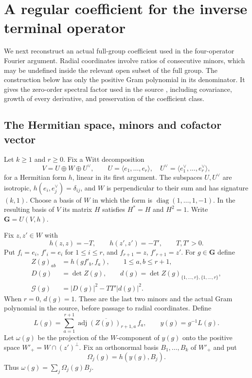 \section{A regular coefficient for the inverse terminal operator}
\label{rl-section}

We next reconstruct an actual full-group coefficient used in the
four-operator Fourier argument.  Radial coordinates involve ratios
of consecutive minors, which may be undefined inside the relevant
open subset of the full group.  The construction below has only the
positive Gram polynomial in its denominator.  It gives the
zero-order spectral factor used in the source
\cite{alpo-uniform-source}, including covariance, growth of every
derivative, and preservation of the coefficient class.

\subsection{The Hermitian space, minors and cofactor vector}

Let $k\geq1$ and $r\geq0$.  Fix a Witt decomposition
\[
 V=U\oplus W\oplus U^\vee,\qquad
 U=\langle e_1,\ldots,e_r\rangle,\quad
 U^\vee=\langle e_1^\vee,\ldots,e_r^\vee\rangle,
\]
for a Hermitian form $h$, linear in its first argument.
The subspaces $U,U^\vee$ are isotropic,
$h(e_i,e_j^\vee)=\delta_{ij}$, and $W$ is perpendicular
to their sum and has signature $(k,1)$.
Choose a basis of $W$ in which the form is
$\operatorname{diag}(1,\ldots,1,-1)$.
In the resulting basis of $V$ its matrix $H$ satisfies
$H^*=H$ and $H^2=1$.
Write $\mathbf G=U(V,h)$.

Fix $z,z'\in W$ with
\[
                 h(z,z)=-T,\qquad h(z',z')=-T',
                         \qquad T,T'>0.
\]
Put $f_i=e_i$, $f'_i=e_i$ for $1\leq i\leq r$, and
$f_{r+1}=z$, $f'_{r+1}=z'$.
For $g\in\mathbf G$ define
\begin{align}
 Z(g)_{ab}&=h(gf'_b,f_a),\qquad 1\leq a,b\leq r+1,
                                      \label{rl-Z}\\
 D(g)&=\det Z(g),\qquad
 d(g)=\det Z(g)_{\{1,\ldots,r\},\{1,\ldots,r\}},\nonumber\\
 \mathcal G(g)&=|D(g)|^2-TT'|d(g)|^2. \label{rl-Gram}
\end{align}
When $r=0$, $d(g)=1$.
These are the last two minors and the actual Gram polynomial
in the source, before passage to radial coordinates.
Define
\begin{equation}\label{rl-cofactor-vector}
 L(g)=\sum_{a=1}^{r+1}
        \overline{\operatorname{adj}(Z(g))_{r+1,a}}\,f_a,
 \qquad y(g)=g^{-1}L(g).
\end{equation}
Let $\omega(g)$ be the projection of the $W$-component
of $y(g)$ onto the positive space
$W'_+=W\cap(z')^\perp$.
Fix an orthonormal basis $B_1,\ldots,B_k$ of $W'_+$ and put
\[
                 \Omega_j(g)=h(y(g),B_j).
\]
Thus $\omega(g)=\sum_j\Omega_j(g)B_j$.

